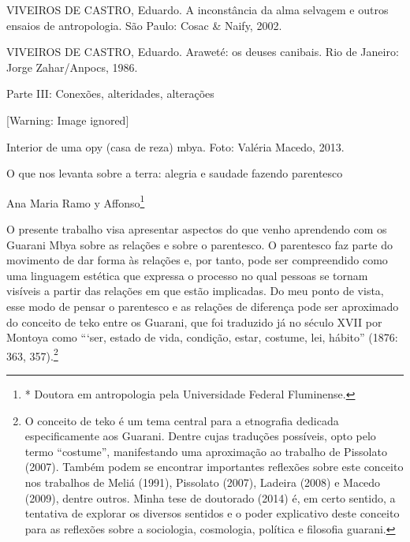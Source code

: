 \documentclass{article}
\begin{document}
VIVEIROS DE CASTRO, Eduardo. A inconst\^ancia da alma selvagem e outros
ensaios de antropologia. S\~ao Paulo: Cosac \& Naify, 2002.

VIVEIROS DE CASTRO, Eduardo. Arawet\'e: os deuses canibais. Rio de
Janeiro: Jorge Zahar/Anpocs, 1986.

Parte III: Conex\~oes, alteridades, altera\c{c}\~oes

  [Warning: Image ignored] %
 

Interior de uma opy (casa de reza) mbya. Foto: Val\'eria Macedo, 2013.

O que nos levanta sobre a terra: alegria e saudade fazendo parentesco

Ana Maria Ramo y Affonso\footnote{* Doutora em antropologia pela
Universidade Federal Fluminense.}

O presente trabalho visa apresentar aspectos do que venho aprendendo com
os Guarani Mbya sobre as rela\c{c}\~oes e sobre o parentesco. O
parentesco faz parte do movimento de dar forma \`as rela\c{c}\~oes e,
por tanto, pode ser compreendido como uma linguagem est\'etica que
expressa o processo no qual pessoas se tornam vis\'iveis a partir das
rela\c{c}\~oes em que est\~ao implicadas. Do meu ponto de vista, esse
modo de pensar o parentesco e as rela\c{c}\~oes de diferen\c{c}a pode
ser aproximado do conceito de teko entre os Guarani, que foi traduzido
j\'a no s\'eculo XVII por Montoya como
{\textquotedblleft}{\textquoteleft}ser, estado de vida, condi\c{c}\~ao,
estar, costume, lei, h\'abito{\textquotedblright} (1876: 363,
357).\footnote{ O conceito de teko \'e um tema central para a
etnografia dedicada especificamente aos Guarani. Dentre cujas
tradu\c{c}\~oes poss\'iveis, opto pelo termo
{\textquotedblleft}costume{\textquotedblright}, manifestando uma
aproxima\c{c}\~ao ao trabalho de Pissolato (2007). Tamb\'em podem se
encontrar importantes reflex\~oes sobre este conceito nos trabalhos de
Meli\'a (1991), Pissolato (2007), Ladeira (2008) e Macedo (2009),
dentre outros. Minha tese de doutorado (2014) \'e, em certo sentido, a
tentativa de explorar os diversos sentidos e o poder explicativo deste
conceito para as reflex\~oes sobre a sociologia, cosmologia, pol\'itica
e filosofia guarani. }
\end{document}
